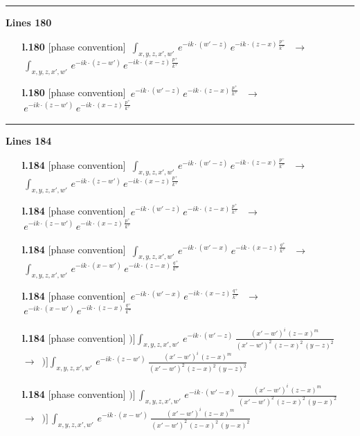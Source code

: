 \documentclass[10pt]{article}
\begin{document}
\noindent\rule{\linewidth}{0.3pt}\par\noindent\textbf{Lines 180} \par
\begin{itemize}[leftmargin=2.2em,itemsep=1pt,topsep=2pt]
\item[\textbf{l.180}] \textsf{\small [phase convention]} $\displaystyle \, \int_{x,y,z,x',w'}\,e^{-ik\cdot(w'-z)}\,e^{-ik\cdot (z-x)\,\frac{p^{+}}{k^{+}}}\,$\ $\longrightarrow$\ $\displaystyle \, \int_{x,y,z,x',w'}\,e^{-ik\cdot(z-w')}\,e^{-ik\cdot (x-z)\,\frac{p^{+}}{k^{+}}}\,$
\item[\textbf{l.180}] \textsf{\small [phase convention]} $\displaystyle \,e^{-ik\cdot(w'-z)}\,e^{-ik\cdot (z-x)\,\frac{p^{+}}{k^{+}}}\,$\ $\longrightarrow$\ $\displaystyle \,e^{-ik\cdot(z-w')}\,e^{-ik\cdot (x-z)\,\frac{p^{+}}{k^{+}}}\,$
\end{itemize}
\noindent\rule{\linewidth}{0.3pt}\par\noindent\textbf{Lines 184} \par
\begin{itemize}[leftmargin=2.2em,itemsep=1pt,topsep=2pt]
\item[\textbf{l.184}] \textsf{\small [phase convention]} $\displaystyle \,\int_{x,y,z,x',w'}\, e^{-ik\cdot(w'-z)}\,e^{-ik\cdot (z-x)\,\frac{p^{+}}{k^{+}}}\,$\ $\longrightarrow$\ $\displaystyle \,\int_{x,y,z,x',w'}\, e^{-ik\cdot(z-w')}\,e^{-ik\cdot (x-z)\,\frac{p^{+}}{k^{+}}}\,$
\item[\textbf{l.184}] \textsf{\small [phase convention]} $\displaystyle \, e^{-ik\cdot(w'-z)}\,e^{-ik\cdot (z-x)\,\frac{p^{+}}{k^{+}}}\,$\ $\longrightarrow$\ $\displaystyle \, e^{-ik\cdot(z-w')}\,e^{-ik\cdot (x-z)\,\frac{p^{+}}{k^{+}}}\,$
\item[\textbf{l.184}] \textsf{\small [phase convention]} $\displaystyle \, \int_{x,y,z,x',w'}\,e^{-ik\cdot(w'-x)}\,e^{-ik\cdot (x-z)\,\frac{q^{+}}{k^{+}}}\,$\ $\longrightarrow$\ $\displaystyle \, \int_{x,y,z,x',w'}\,e^{-ik\cdot(x-w')}\,e^{-ik\cdot (z-x)\,\frac{q^{+}}{k^{+}}}\,$
\item[\textbf{l.184}] \textsf{\small [phase convention]} $\displaystyle \,e^{-ik\cdot(w'-x)}\,e^{-ik\cdot (x-z)\,\frac{q^{+}}{k^{+}}}\,$\ $\longrightarrow$\ $\displaystyle \,e^{-ik\cdot(x-w')}\,e^{-ik\cdot (z-x)\,\frac{q^{+}}{k^{+}}}\,$
\item[\textbf{l.184}] \textsf{\small [phase convention]} $\displaystyle \Big)\Big] \int_{x,y,z,x',w'}\,e^{-ik\cdot(w'-z)}\, \frac{(x'-w')^{i}\,(z-x)^{m}}{(x'-w')^{2}\,(z-x)^{2}\, (y-z)^{2}}\,$\ $\longrightarrow$\ $\displaystyle \Big)\Big] \int_{x,y,z,x',w'}\,e^{-ik\cdot(z-w')}\, \frac{(x'-w')^{i}\,(z-x)^{m}}{(x'-w')^{2}\,(z-x)^{2}\, (y-z)^{2}}\,$
\item[\textbf{l.184}] \textsf{\small [phase convention]} $\displaystyle )\Big]\, \int_{x,y,z,x',w'}\,e^{-ik\cdot(w'-x)}\,\frac{(x'-w')^{i}\,(z-x)^{m}}{(x'-w')^{2}\,(z-x)^{2}\,(y-x)^{2}}$\ $\longrightarrow$\ $\displaystyle )\Big]\, \int_{x,y,z,x',w'}\,e^{-ik\cdot(x-w')}\,\frac{(x'-w')^{i}\,(z-x)^{m}}{(x'-w')^{2}\,(z-x)^{2}\,(y-x)^{2}}$
\end{itemize}
\end{document}

